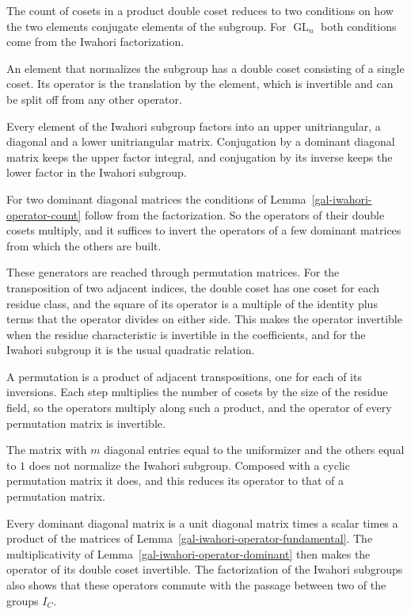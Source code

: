 The count of cosets in a product double coset reduces to two conditions on how the two elements
conjugate elements of the subgroup. For $\operatorname{GL}_n$ both conditions come from the Iwahori
factorization.

An element that normalizes the subgroup has a double coset consisting of a single coset. Its operator is
the translation by the element, which is invertible and can be split off from any other operator.

Every element of the Iwahori subgroup factors into an upper unitriangular, a diagonal and a lower
unitriangular matrix. Conjugation by a dominant diagonal matrix keeps the upper factor integral, and
conjugation by its inverse keeps the lower factor in the Iwahori subgroup.

For two dominant diagonal matrices the conditions of Lemma~\ref{gal-iwahori-operator-count} follow from
the factorization. So the operators of their double cosets multiply, and it suffices to invert the
operators of a few dominant matrices from which the others are built.

These generators are reached through permutation matrices. For the transposition of two adjacent
indices, the double coset has one coset for each residue class, and the square of its operator is a
multiple of the identity plus terms that the operator divides on either side. This makes the operator
invertible when the residue characteristic is invertible in the coefficients, and for the Iwahori
subgroup it is the usual quadratic relation.

A permutation is a product of adjacent transpositions, one for each of its inversions. Each step
multiplies the number of cosets by the size of the residue field, so the operators multiply along such a
product, and the operator of every permutation matrix is invertible.

The matrix with $m$ diagonal entries equal to the uniformizer and the others equal to $1$ does not
normalize the Iwahori subgroup. Composed with a cyclic permutation matrix it does, and this reduces its
operator to that of a permutation matrix.

Every dominant diagonal matrix is a unit diagonal matrix times a scalar times a product of the matrices of
Lemma~\ref{gal-iwahori-operator-fundamental}. The multiplicativity of
Lemma~\ref{gal-iwahori-operator-dominant} then makes the operator of its double coset invertible. The factorization of
the Iwahori subgroups also shows that these operators commute with the passage between two of the groups $I_C$.

